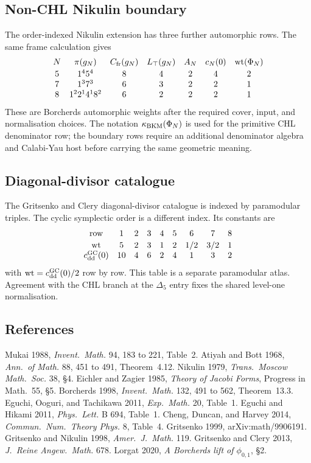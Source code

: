\subsection*{Non-CHL Nikulin boundary}

The order-indexed Nikulin extension has three further automorphic
rows.  The same frame calculation gives
\[
\begin{array}{c c c c c c c}
N & \pi(g_N) & C_{\mathrm{fr}}(g_N) & L_{\top}(g_N) &
A_N & c_N(0) & \operatorname{wt}(\Phi_N)\\[2pt]
5 & 1^4 5^4 & 8 & 4 & 2 & 4 & 2\\
7 & 1^3 7^3 & 6 & 3 & 2 & 2 & 1\\
8 & 1^2 2^1 4^1 8^2 & 6 & 2 & 2 & 2 & 1
\end{array}
\]
These are Borcherds automorphic weights after the required cover,
input, and normalisation choices.  The notation
$\kappa_{\mathrm{BKM}}(\Phi_N)$ is used for the primitive CHL denominator row;
the boundary rows require an additional denominator algebra and
Calabi-Yau host before carrying the same geometric meaning.

\subsection*{Diagonal-divisor catalogue}

The Gritsenko and Clery diagonal-divisor catalogue is indexed by
paramodular triples.  The cyclic symplectic order is a different index.
Its constants are
\[
\begin{array}{c c c c c c c c c}
\mathrm{row} & 1&2&3&4&5&6&7&8\\[2pt]
\operatorname{wt} & 5&2&3&1&2&1/2&3/2&1\\
c_{\mathrm{dd}}^{\mathrm{GC}}(0) & 10&4&6&2&4&1&3&2
\end{array}
\]
with $\operatorname{wt}=c_{\mathrm{dd}}^{\mathrm{GC}}(0)/2$ row by row.  This table is a separate
paramodular atlas.  Agreement with the CHL branch at the $\Delta_5$
entry fixes the shared level-one normalisation.

\subsection*{References}

Mukai 1988, \emph{Invent.\ Math.} 94, 183 to 221, Table~2.
Atiyah and Bott 1968, \emph{Ann.\ of Math.} 88, 451 to 491,
Theorem~4.12.
Nikulin 1979, \emph{Trans.\ Moscow Math.\ Soc.} 38, \S4.
Eichler and Zagier 1985, \emph{Theory of Jacobi Forms}, Progress in
Math.\ 55, \S5.
Borcherds 1998, \emph{Invent.\ Math.} 132, 491 to 562, Theorem~13.3.
Eguchi, Ooguri, and Tachikawa 2011, \emph{Exp.\ Math.} 20, Table~1.
Eguchi and Hikami 2011, \emph{Phys.\ Lett.} B 694, Table~1.
Cheng, Duncan, and Harvey 2014, \emph{Commun.\ Num.\ Theory Phys.} 8,
Table~4.
Gritsenko 1999, arXiv:math/9906191.
Gritsenko and Nikulin 1998, \emph{Amer.\ J.\ Math.} 119.
Gritsenko and Clery 2013, \emph{J.\ Reine Angew.\ Math.} 678.
Lorgat 2020, \emph{A Borcherds lift of $\phi_{0,1}$}, \S2.
